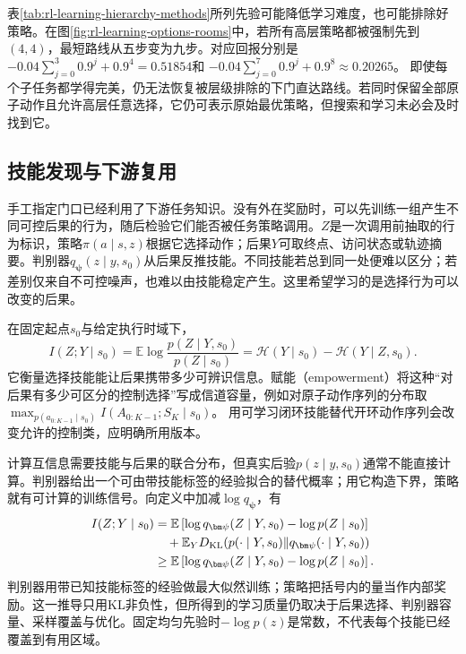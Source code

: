 表\ref{tab:rl-learning-hierarchy-methods}所列先验可能降低学习难度，也可能排除好策略。在图\ref{fig:rl-learning-options-rooms}中，若所有高层策略都被强制先到$(4,4)$，最短路线从五步变为九步。对应回报分别是
$-0.04\sum_{j=0}^{3}0.9^j+0.9^4=0.51854$和
$-0.04\sum_{j=0}^{7}0.9^j+0.9^8\approx0.20265$。
即使每个子任务都学得完美，仍无法恢复被层级排除的下门直达路线。若同时保留全部原子动作且允许高层任意选择，它仍可表示原始最优策略，但搜索和学习未必会及时找到它。

\subsection{技能发现与下游复用}
\label{sec:rl-learning-skill-discovery}

手工指定门口已经利用了下游任务知识。没有外在奖励时，可以先训练一组产生不同可控后果的行为，随后检验它们能否被任务策略调用。$Z$是一次调用前抽取的行为标识，策略$\pi(a\mid s,z)$根据它选择动作；后果$Y$可取终点、访问状态或轨迹摘要。判别器$q_{\bm\psi}(z\mid y,s_0)$从后果反推技能。不同技能若总到同一处便难以区分；若差别仅来自不可控噪声，也难以由技能稳定产生。这里希望学习的是选择行为可以改变的后果。

\begin{definition}[互信息与赋能的控制含义]
  \label{def:rl-learning-empowerment}
  在固定起点$s_0$与给定执行时域下，
  \[
    I(Z;Y\mid s_0)
      =\mathbb E\log\frac{p(Z\mid Y,s_0)}{p(Z\mid s_0)}
      =\mathcal H(Y\mid s_0)-\mathcal H(Y\mid Z,s_0).
  \]
  它衡量选择技能能让后果携带多少可辨识信息。赋能（empowerment）将这种“对后果有多少可区分的控制选择”写成信道容量，例如对原子动作序列的分布取
  $\max_{p(a_{0:K-1}\mid s_0)}I(A_{0:K-1};S_K\mid s_0)$。
  用可学习闭环技能替代开环动作序列会改变允许的控制类，应明确所用版本。
\end{definition}

计算互信息需要技能与后果的联合分布，但真实后验$p(z\mid y,s_0)$通常不能直接计算。判别器给出一个可由带技能标签的经验拟合的替代概率；用它构造下界，策略就有可计算的训练信号。向定义中加减$\log q_{\bm\psi}$，有
\begin{align}
 I(Z;Y\mid s_0)
   &=\mathbb E\left[\log q_{\bm\psi}(Z\mid Y,s_0)
                                  -\log p(Z\mid s_0)\right]\notag\\
   &\quad+\mathbb E_Y D_{\mathrm{KL}}
       (p(\cdot\mid Y,s_0)\|q_{\bm\psi}(\cdot\mid Y,s_0))\notag\\
   &\geq\mathbb E\left[\log q_{\bm\psi}(Z\mid Y,s_0)
                                  -\log p(Z\mid s_0)\right].
 \label{eq:rl-learning-skill-mi}
\end{align}
判别器用带已知技能标签的经验做最大似然训练；策略把括号内的量当作内部奖励。这一推导只用KL非负性，但所得到的学习质量仍取决于后果选择、判别器容量、采样覆盖与优化。固定均匀先验时$-\log p(z)$是常数，不代表每个技能已经覆盖到有用区域。


